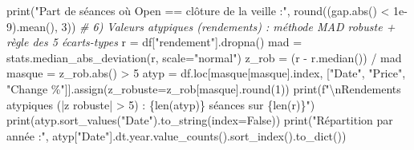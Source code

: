 \documentclass[
  10pt,
]{article}
\newenvironment{Shaded}{}{}
\newcommand{\BuiltInTok}[1]{\textcolor[rgb]{0.00,0.50,0.00}{#1}}
\newcommand{\CharTok}[1]{\textcolor[rgb]{0.25,0.44,0.63}{#1}}
\newcommand{\CommentTok}[1]{\textcolor[rgb]{0.38,0.63,0.69}{\textit{#1}}}
\newcommand{\DecValTok}[1]{\textcolor[rgb]{0.25,0.63,0.44}{#1}}
\newcommand{\FloatTok}[1]{\textcolor[rgb]{0.25,0.63,0.44}{#1}}
\newcommand{\NormalTok}[1]{#1}
\newcommand{\OperatorTok}[1]{\textcolor[rgb]{0.40,0.40,0.40}{#1}}
\newcommand{\SpecialCharTok}[1]{\textcolor[rgb]{0.25,0.44,0.63}{#1}}
\newcommand{\SpecialStringTok}[1]{\textcolor[rgb]{0.73,0.40,0.53}{#1}}
\newcommand{\StringTok}[1]{\textcolor[rgb]{0.25,0.44,0.63}{#1}}
\newcommand{\VariableTok}[1]{\textcolor[rgb]{0.10,0.09,0.49}{#1}}
\begin{document}
\begin{Shaded}
\begin{Highlighting}[]
\BuiltInTok{print}\NormalTok{(}\StringTok{"Part de séances où Open == clôture de la veille :"}\NormalTok{, }\BuiltInTok{round}\NormalTok{((gap.}\BuiltInTok{abs}\NormalTok{() }\OperatorTok{\textless{}} \FloatTok{1e{-}9}\NormalTok{).mean(), }\DecValTok{3}\NormalTok{))}
\CommentTok{\# 6) Valeurs atypiques (rendements) : méthode MAD robuste + règle des 5 écarts{-}types}
\NormalTok{r }\OperatorTok{=}\NormalTok{ df[}\StringTok{"rendement"}\NormalTok{].dropna()}
\NormalTok{mad }\OperatorTok{=}\NormalTok{ stats.median\_abs\_deviation(r, scale}\OperatorTok{=}\StringTok{"normal"}\NormalTok{)}
\NormalTok{z\_rob }\OperatorTok{=}\NormalTok{ (r }\OperatorTok{{-}}\NormalTok{ r.median()) }\OperatorTok{/}\NormalTok{ mad}
\NormalTok{masque }\OperatorTok{=}\NormalTok{ z\_rob.}\BuiltInTok{abs}\NormalTok{() }\OperatorTok{\textgreater{}} \DecValTok{5}
\NormalTok{atyp }\OperatorTok{=}\NormalTok{ df.loc[masque[masque].index, [}\StringTok{"Date"}\NormalTok{, }\StringTok{"Price"}\NormalTok{, }\StringTok{"Change \%"}\NormalTok{]].assign(z\_robuste}\OperatorTok{=}\NormalTok{z\_rob[masque].}\BuiltInTok{round}\NormalTok{(}\DecValTok{1}\NormalTok{))}
\BuiltInTok{print}\NormalTok{(}\SpecialStringTok{f"}\CharTok{\textbackslash{}n}\SpecialStringTok{Rendements atypiques (|z robuste| \textgreater{} 5) : }\SpecialCharTok{\{}\BuiltInTok{len}\NormalTok{(atyp)}\SpecialCharTok{\}}\SpecialStringTok{ séances sur }\SpecialCharTok{\{}\BuiltInTok{len}\NormalTok{(r)}\SpecialCharTok{\}}\SpecialStringTok{"}\NormalTok{)}
\BuiltInTok{print}\NormalTok{(atyp.sort\_values(}\StringTok{"Date"}\NormalTok{).to\_string(index}\OperatorTok{=}\VariableTok{False}\NormalTok{))}
\BuiltInTok{print}\NormalTok{(}\StringTok{"Répartition par année :"}\NormalTok{, atyp[}\StringTok{"Date"}\NormalTok{].dt.year.value\_counts().sort\_index().to\_dict())}
\end{Highlighting}
\end{Shaded}
\end{document}
